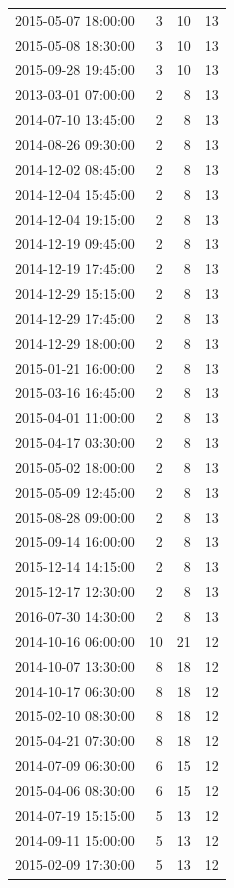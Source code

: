 \begin{tabular}{lrrr}
2015-05-07 18:00:00 & 3 & 10 & 13 \\
2015-05-08 18:30:00 & 3 & 10 & 13 \\
2015-09-28 19:45:00 & 3 & 10 & 13 \\
2013-03-01 07:00:00 & 2 & 8 & 13 \\
2014-07-10 13:45:00 & 2 & 8 & 13 \\
2014-08-26 09:30:00 & 2 & 8 & 13 \\
2014-12-02 08:45:00 & 2 & 8 & 13 \\
2014-12-04 15:45:00 & 2 & 8 & 13 \\
2014-12-04 19:15:00 & 2 & 8 & 13 \\
2014-12-19 09:45:00 & 2 & 8 & 13 \\
2014-12-19 17:45:00 & 2 & 8 & 13 \\
2014-12-29 15:15:00 & 2 & 8 & 13 \\
2014-12-29 17:45:00 & 2 & 8 & 13 \\
2014-12-29 18:00:00 & 2 & 8 & 13 \\
2015-01-21 16:00:00 & 2 & 8 & 13 \\
2015-03-16 16:45:00 & 2 & 8 & 13 \\
2015-04-01 11:00:00 & 2 & 8 & 13 \\
2015-04-17 03:30:00 & 2 & 8 & 13 \\
2015-05-02 18:00:00 & 2 & 8 & 13 \\
2015-05-09 12:45:00 & 2 & 8 & 13 \\
2015-08-28 09:00:00 & 2 & 8 & 13 \\
2015-09-14 16:00:00 & 2 & 8 & 13 \\
2015-12-14 14:15:00 & 2 & 8 & 13 \\
2015-12-17 12:30:00 & 2 & 8 & 13 \\
2016-07-30 14:30:00 & 2 & 8 & 13 \\
2014-10-16 06:00:00 & 10 & 21 & 12 \\
2014-10-07 13:30:00 & 8 & 18 & 12 \\
2014-10-17 06:30:00 & 8 & 18 & 12 \\
2015-02-10 08:30:00 & 8 & 18 & 12 \\
2015-04-21 07:30:00 & 8 & 18 & 12 \\
2014-07-09 06:30:00 & 6 & 15 & 12 \\
2015-04-06 08:30:00 & 6 & 15 & 12 \\
2014-07-19 15:15:00 & 5 & 13 & 12 \\
2014-09-11 15:00:00 & 5 & 13 & 12 \\
2015-02-09 17:30:00 & 5 & 13 & 12 \\

\end{tabular}

